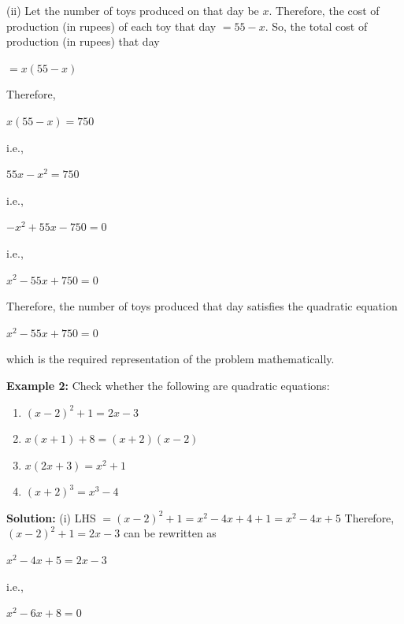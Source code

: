 \documentclass[11pt]{article}
\begin{document}
\medskip
\noindent
(ii) Let the number of toys produced on that day be $x$.
Therefore, the cost of production (in rupees) of each toy that day $= 55 - x$.
So, the total cost of production (in rupees) that day

\begin{center}
$= x(55 - x)$
\end{center}

Therefore,

\begin{center}
$x(55 - x) = 750$
\end{center}

i.e.,

\begin{center}
$55x - x^2 = 750$
\end{center}

i.e.,

\begin{center}
$-x^2 + 55x - 750 = 0$
\end{center}

i.e.,

\begin{center}
$x^2 - 55x + 750 = 0$
\end{center}

Therefore, the number of toys produced that day satisfies the quadratic equation

\begin{center}
$x^2 - 55x + 750 = 0$
\end{center}

which is the required representation of the problem mathematically.
\medskip

\noindent\textcolor{chapterblue}{\textbf{Example 2:}} Check whether the following are quadratic equations:
\begin{enumerate}
\renewcommand{\labelenumi}{(\roman{enumi})}
\item $(x - 2)^2 + 1 = 2x - 3$ \item $x(x + 1) + 8 = (x + 2)(x - 2)$
\item $x(2x + 3) = x^2 + 1$ \item $(x + 2)^3 = x^3 - 4$
\end{enumerate}
\noindent
\textcolor{chapterblue}{\textbf{Solution:}}
\noindent
(i) LHS $= (x - 2)^2 + 1 = x^2 - 4x + 4 + 1 = x^2 - 4x + 5$
Therefore, $(x - 2)^2 + 1 = 2x - 3$ can be rewritten as
\begin{center}
$x^2 - 4x + 5 = 2x - 3$
\end{center}
i.e.,
\begin{center}
$x^2 - 6x + 8 = 0$
\end{center}
\end{document}

